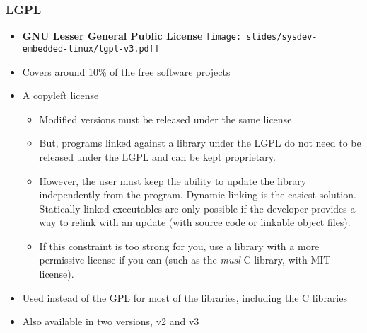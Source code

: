 \begin{frame}
  \frametitle{LGPL}
  \begin{itemize}
  \item {\bf GNU Lesser General Public License}
    \hfill \texttt{[image: slides/sysdev-embedded-linux/lgpl-v3.pdf]}
  \item Covers around 10\% of the free software projects
  \item A copyleft license
    \begin{itemize}
    \item Modified versions must be released under the same license
    \item But, programs linked against a library under the LGPL do not
      need to be released under the LGPL and can be kept proprietary.
    \item However, the user must keep the ability to update the
      library independently from the program. Dynamic linking is the
      easiest solution. Statically linked executables are only possible
      if the developer provides a way to relink with an update
      (with source code or linkable object files).
    \item If this constraint is too strong for you, use a library
      with a more permissive license if you can (such as the {\em musl}
      C library, with MIT license).
    \end{itemize}
  \item Used instead of the GPL for most of the libraries, including
    the C libraries
  \item Also available in two versions, v2 and v3
  \end{itemize}
\end{frame}

